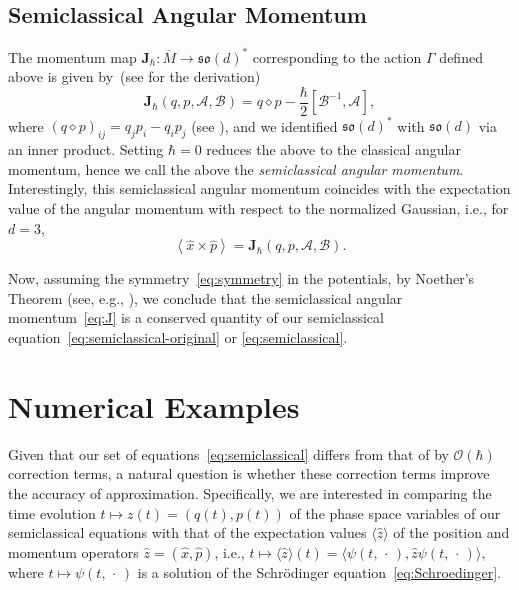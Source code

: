\documentclass[10pt]{article}
\begin{document}
\subsection{Semiclassical Angular Momentum}
The momentum map $\mathbf{J}_{\hbar}\colon \overline{M} \to \mathfrak{so}(d)^{*}$ corresponding to the action $\Gamma$ defined above is given by~(see \citet[Section 3]{Oh2015b} for the derivation)
\begin{equation}
  \label{eq:J}
  \mathbf{J}_{\hbar}(q,p,\mathcal{A},\mathcal{B}) = q \diamond p - \frac{\hbar}{2} [\mathcal{B}^{-1}, \mathcal{A}],
\end{equation}
where $(q \diamond p)_{ij} = q_j p_i - q_i p_j$ (see \citet[Remark 6.3.3]{Ho2011b}), and we identified $\mathfrak{so}(d)^{*}$ with $\mathfrak{so}(d)$ via an inner product.
Setting $\hbar = 0$ reduces the above to the classical angular momentum, hence we call the above the \textit{semiclassical angular momentum}.
Interestingly, this semiclassical angular momentum coincides with the expectation value of the angular momentum with respect to the normalized Gaussian, i.e., for $d = 3$,
\begin{equation*}
  \left\langle \hat{x} \times \hat{p} \right\rangle
  = \mathbf{J}_{\hbar}(q,p,\mathcal{A},\mathcal{B}).
\end{equation*}

Now, assuming the symmetry~\eqref{eq:symmetry} in the potentials, by Noether's Theorem (see, e.g., \citet[Theorem 11.4.1]{MaRa1999}), we conclude that the semiclassical angular momentum~\eqref{eq:J} is a conserved quantity of our semiclassical equation~\eqref{eq:semiclassical-original} or \eqref{eq:semiclassical}.


\section{Numerical Examples}
Given that our set of equations~\eqref{eq:semiclassical} differs from that of \citeauthor{Zh2014} by $\mathcal{O}(\hbar)$ correction terms, a natural question is whether these correction terms improve the accuracy of approximation.
Specifically, we are interested in comparing the time evolution $t \mapsto z(t) = (q(t), p(t))$ of the phase space variables of our semiclassical equations with that of the expectation values $\langle \hat{z}\rangle$ of the position and momentum operators $\hat{z} = (\hat{x}, \hat{p})$, i.e., $t \mapsto \langle \hat{z}\rangle(t) = \langle \psi(t,\,\cdot\,), \hat{z} \psi(t,\,\cdot\,)\rangle$, where $t \mapsto \psi(t,\,\cdot\,)$ is a solution of the Schr\"odinger equation~\eqref{eq:Schroedinger}.
\end{document}
